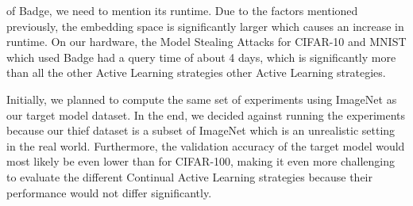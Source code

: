 of Badge, we need to mention its runtime. Due to the factors mentioned previously, the embedding space is significantly larger which causes an increase in runtime. On our hardware, the Model Stealing Attacks for CIFAR-10 and MNIST which used Badge had a query time of about 4 days, which is
significantly more than all the other Active Learning strategies other Active Learning strategies. \par
Initially, we planned to compute the same set of experiments using ImageNet as our target model dataset. In the end, we decided against running the experiments because our thief dataset is a subset of ImageNet which is an unrealistic setting in the real world. Furthermore, the validation
accuracy of the target model would most likely be even lower than for CIFAR-100, making it even more challenging to evaluate the different Continual Active Learning strategies because their performance would not differ significantly.

